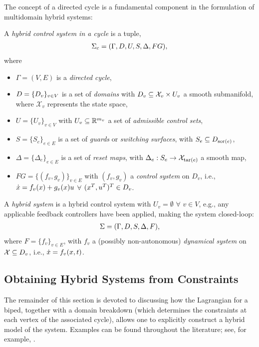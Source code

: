 The concept of a directed cycle is a fundamental component in the formulation
of multidomain hybrid systems:

\begin{definition} A {\em hybrid control system in a cycle} is a tuple,
  \begin{align}
    \Sigma_{c} = (\Gamma, D, U, S, \Delta, FG),
  \end{align}
  where
  \begin{itemize}
  \item $\Gamma = (V,E)$ is a {\em directed cycle},
  \item $D = \{D_{v}\}_{v \in V}$ is a set of {\em domains} with $D_{v}
    \subseteq \mathcal{X}_{v} \times U_v$ a smooth submanifold, where
    $\mathcal{X}_{v}$ represents the state space,
  \item $U = \{U_{v}\}_{v \in V}$ with $U_{v} \subseteq \mathbb{R}^{m_{v}}$ a set of
    {\em admissible control sets},
  \item $S = \{S_{e}\}_{e \in E}$ is a set of {\em guards} or {\em switching
      surfaces}, with $S_{e} \subseteq D_{\mathrm{sor}(e)}$,
  \item $\Delta = \{\Delta_{e}\}_{e \in E}$ is a set of {\em reset maps}, with
    $\Delta_{e} : S_{e} \to \mathcal{X}_{\mathrm{tar}(e)}$ a smooth map,
  \item $FG = \{(f_{v}, g_{v})\}_{v \in E}$ with $(f_v,g_v)$ a {\em control
      system} on $D_{v}$, i.e., $\dot{x} = f_{v}(x) + g_{v}(x) u$ $\forall$
    $(x^{T}, u^{T})^{T} \in D_{v}$.
  \end{itemize}
\end{definition}

\begin{definition}
  A {\em hybrid system} is a hybrid control system with $U_v = \emptyset$
  $\forall$ $v \in V$, e.g., any applicable feedback controllers have been
  applied, making the system closed-loop:
  \begin{align}
    \Sigma = (\Gamma, D, S, \Delta, F),
  \end{align}
  where $F = \{f_{v}\}_{v \in E}$, with $f_{v}$ a (possibly non-autonomous) {\em
    dynamical system} on $\mathcal{X} \subseteq D_{v}$, i.e., ${\dot {x}} =
  f_{v}(x,t)$.
\end{definition}

\subsection{Obtaining Hybrid Systems from Constraints}
The remainder of this section is devoted to discussing how the Lagrangian for a
biped, together with a domain breakdown (which determines the constraints at
each vertex of the associated cycle), allows one to explicitly construct a
hybrid model of the system.
%
Examples can be found throughout the literature; see, for example, \cite{Grizzle2010,Grizzle2014,Sinnet2009}.


